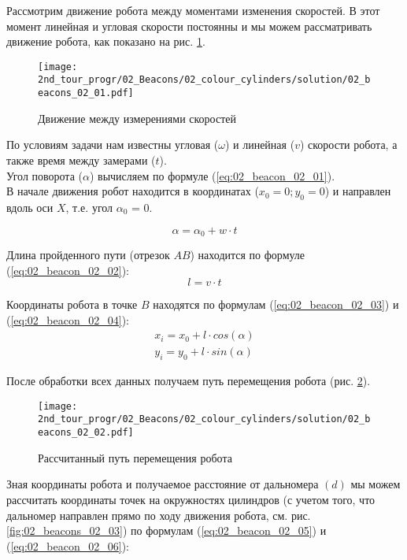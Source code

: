 \solutionSection

Рассмотрим движение робота между моментами изменения скоростей. В этот момент линейная и угловая скорости постоянны и мы можем рассматривать движение робота, как показано на рис. \ref{fig:02_beacons_02_01}.

\begin{figure}[h!]
	\centering
	\texttt{[image: 2nd\_tour\_progr/02\_Beacons/02\_colour\_cylinders/solution/02\_beacons\_02\_01.pdf]}
	\caption{Движение между измерениями скоростей}
	\label{fig:02_beacons_02_01}
\end{figure}

По условиям задачи нам известны угловая ($\omega$) и линейная ($v$) скорости робота, а также время между замерами ($t$).\\
Угол поворота ($\alpha$) вычисляем по формуле (\ref{eq:02_beacon_02_01}). \\
В начале движения робот находится в координатах ($x_0 = 0; y_0 = 0$) и направлен вдоль оси $X$, т.е. угол $\alpha_0$ = 0.

\begin{equation}
\alpha = \alpha_0 + w \cdot t
\label{eq:02_beacon_02_01}
\end{equation}

Длина пройденного пути (отрезок $AB$) находится по формуле (\ref{eq:02_beacon_02_02}):
\begin{equation}
l = v \cdot t
\label{eq:02_beacon_02_02}
\end{equation}

Координаты робота в точке $B$ находятся по формулам (\ref{eq:02_beacon_02_03}) и (\ref{eq:02_beacon_02_04}):
\begin{eqnarray}
x_i = x_0 + l \cdot cos(\alpha)
\label{eq:02_beacon_02_03}\\
y_i = y_0 + l \cdot sin(\alpha)
\label{eq:02_beacon_02_04}
\end{eqnarray}

После обработки всех данных получаем путь перемещения робота (рис. \ref{fig:02_beacons_02_02}).
\begin{figure}[h!]
	\centering
	\texttt{[image: 2nd\_tour\_progr/02\_Beacons/02\_colour\_cylinders/solution/02\_beacons\_02\_02.pdf]}
	\caption{Рассчитанный путь перемещения робота}
	\label{fig:02_beacons_02_02}
\end{figure}


Зная координаты робота и получаемое расстояние от дальномера $(d)$ мы можем рассчитать координаты точек на окружностях цилиндров (с учетом того, что дальномер направлен прямо по ходу движения робота, см. рис. \ref{fig:02_beacons_02_03}) по формулам (\ref{eq:02_beacon_02_05}) и (\ref{eq:02_beacon_02_06}):

